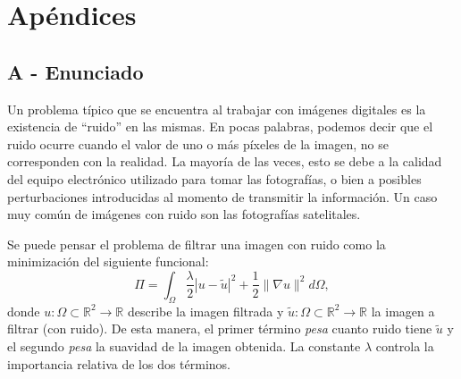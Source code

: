 \documentclass[a4paper]{article}
\begin{document}

\newpage

\section{Apéndices}

\subsection{A - Enunciado}

Un problema típico que se encuentra al trabajar con imágenes digitales es la existencia de ``ruido'' en las mismas. En pocas palabras, podemos decir que el ruido ocurre cuando el valor de uno o más píxeles de la imagen, no se corresponden con la realidad. La mayor\'ia de las veces, esto se debe a la calidad del equipo electr\'onico utilizado para tomar las fotograf\'ias, o bien a posibles perturbaciones introducidas al momento de transmitir la informaci\'on. Un caso muy com\'un de im\'agenes con ruido son las fotograf\'ias satelitales.


Se puede pensar el problema de filtrar una imagen con ruido como la minimizaci\'on del siguiente funcional:
\begin{equation}
  \Pi = \int_\Omega {\frac{\lambda}{2} \left| u - \tilde{u} \right|^2 + \frac{1}{2} \lVert \nabla u \rVert^2 } d\Omega,
\label{funcional}
\end{equation}
donde $u : \Omega \subset \mathbb{R}^2 \to \mathbb{R}$ describe la imagen filtrada y
$\tilde{u} : \Omega \subset \mathbb{R}^2 \to \mathbb{R}$ la imagen a filtrar (con ruido).
De esta manera, el primer t\'ermino \emph{pesa} cuanto ruido tiene $\tilde{u}$ y el segundo \emph{pesa} la suavidad de la imagen obtenida. La constante $\lambda$ controla la importancia relativa de los dos t\'erminos.
\end{document}

